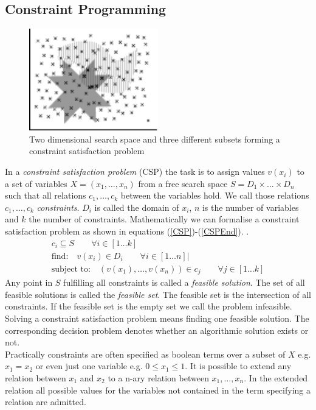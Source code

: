 \subsection{Constraint Programming}
\begin{figure}
\label{fig:CSPExample}
\includegraphics[width=0.5\textwidth]{./pics/SetIntersection.pdf}
\caption{Two dimensional search space and three different subsets forming a constraint satisfaction problem}
\end{figure}
In a \emph{constraint satisfaction problem} (CSP) the task is to assign values $v(x_i)$ to a set of variables $X = (x_1, \dots , x_n)$ from a free search space $S=D_1\times \dots \times D_n$ such that all relations $c_1,\dots,c_k$ between the variables hold. We call those relations $c_1,\dots,c_k$ \emph{constraints}. $D_i$ is called the domain of $x_i$, $n$ is the number of variables and $k$ the number of constraints. Mathematically we can formalise a constraint satisfaction problem as shown in equations (\ref{CSP})-(\ref{CSPEnd}). \cite{Eiben97constraintsatisfaction}\cite{wiki:CSP}.
\begin{eqnarray} 
\label{CSP}
c_i \subseteq S \qquad\forall i \in \left[ 1 \dots k \right]\\
\text{find:} \quad v(x_i) \in D_i \qquad\forall i \in \left[ 1 \dots n \right]| \\
\label{CSPEnd}
\text{subject to:} \quad (v(x_1),\dots , v(x_n)) \in c_j\qquad\forall j \in \left[1 \dots k\right]
\end{eqnarray} 
Any point in $S$ fulfilling all constraints is called a \emph{feasible solution}. The set of all feasible solutions is called the \emph{feasible set}. The feasible set is the intersection of all constraints. If the feasible set is the empty set we call the problem infeasible. Solving a constraint satisfaction problem means finding one feasible solution. The corresponding decision problem denotes whether an algorithmic solution exists or not.\\
Practically constraints are often specified as boolean terms over a subset of $X$ e.g. $x_1=x_2$ or even just one variable e.g. $0\leq x_1 \leq 1$. It is possible to extend any relation between $x_1$ and $x_2$ to a n-ary relation between $x_1,\dots,x_n$. In the extended relation all possible values for the variables not contained in the term specifying a relation are admitted.\\
